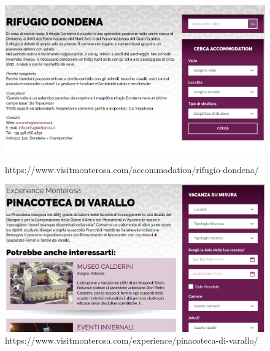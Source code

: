 \documentclass[a4paper, 11pt, parskip=half, headsepline]{scrreprt}
\begin{document}
\begin{figure}[H]
    \begin{minipage}[t]{0.5\textwidth}
        \centering
        \includegraphics[width=1\linewidth, keepaspectratio]{101-consistency-missing-stuff}
        \caption{https://www.visitmonterosa.com/accommodation/rifugio-dondena/}
        \label{fig:consistency-01}
    \end{minipage}   
    \hspace*{\fill}
    \begin{minipage}[t]{0.5\textwidth}
        \centering
        \includegraphics[width=1\linewidth, keepaspectratio]{102-consistency-missing-stuff}
        \caption{https://www.visitmonterosa.com/experience/pinacoteca-di-varallo/}
        \label{fig:consistency-02}
    \end{minipage} 
\end{figure}
\end{document}
